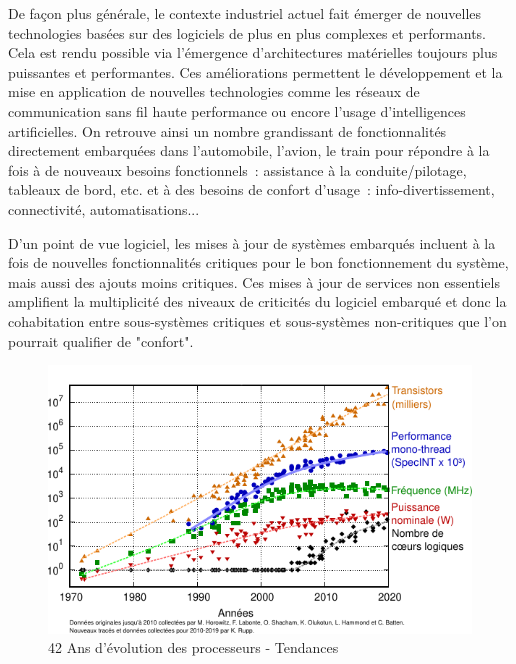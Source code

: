 \documentclass[french, a4paper, 11pt, twoside, pdftex]{StyleThese}
\begin{document}
		De façon plus générale, le contexte industriel actuel fait émerger de nouvelles technologies basées sur des logiciels de plus en plus complexes et performants. Cela est rendu possible via l'émergence d'architectures matérielles toujours plus puissantes et performantes. Ces améliorations permettent le développement et la mise en application de nouvelles technologies comme les réseaux de communication sans fil haute performance ou encore l'usage d'intelligences artificielles. On retrouve ainsi un nombre grandissant de fonctionnalités directement embarquées dans l'automobile, l'avion, le train pour répondre à la fois à de nouveaux besoins fonctionnels~: assistance à la conduite/pilotage, tableaux de bord, etc. et à des besoins de confort d'usage~: info-divertissement, connectivité, automatisations... 
		
		
		D'un point de vue logiciel, les mises à jour de systèmes embarqués incluent à la fois de nouvelles fonctionnalités critiques pour le bon fonctionnement du système, mais aussi des ajouts moins critiques. Ces mises à jour de services non essentiels amplifient  la multiplicité des niveaux de criticités du logiciel embarqué et donc la cohabitation entre sous-systèmes critiques et sous-systèmes non-critiques que l'on pourrait qualifier de "confort". 
		
		\begin{figure}[h]
			\centering
			\includegraphics[width=0.8\linewidth]{graphiques/processors_trend}
			\caption[Évolution des processeurs]{42 Ans d'évolution des processeurs - Tendances}
			\label{fig:processorstrend}
		\end{figure}
		
\end{document}

